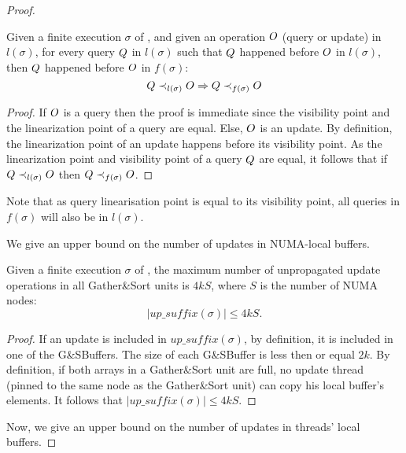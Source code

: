 \begin{proof}
\begin{lemma}\label{Lem: op_order}
Given a finite execution $\sigma$ of \mysketch, and given an operation $\mathnormal{O}$ (query or update) in $l(\sigma)$, for every query $\mathnormal{Q}$ in $l(\sigma)$ such that $\mathnormal{Q}$ happened before $\mathnormal{O}$ in \(l(\sigma)\), then $\mathnormal{Q}$ happened before $\mathnormal{O}$ in \(f(\sigma)\):  \[\mathnormal{Q} \prec_{l(\sigma)}\mathnormal{O} \Rightarrow  \mathnormal{Q} \prec_{f(\sigma)} \mathnormal{O}\]
\end{lemma}
\begin{proof}
If $\mathnormal{O}$ is a query then the proof is immediate since the visibility point and the linearization point of a query are equal. Else, $\mathnormal{O}$ is an update. By definition, the linearization point of an update happens before its visibility point. As the linearization point and visibility point of a query $\mathnormal{Q}$ are equal, it follows that if \(\mathnormal{Q} \prec_{l(\sigma)} \mathnormal{O}\) then \(\mathnormal{Q} \prec_{f(\sigma)} \mathnormal{O}\).
\end{proof}

Note that as query linearisation point is equal to its visibility point, all queries in $f(\sigma)$ will also be in $l(\sigma)$. 

We give an upper bound on the number of updates in NUMA-local buffers.

\begin{lemma}\label{Lem: GSBuffer_updates_num}
Given a finite execution $\sigma$ of \mysketch, the maximum number of unpropagated update operations in all Gather\&Sort units is \(4kS\), where $S$ is the number of NUMA nodes: \[|\mathit{up\_suffix}(\sigma)| \leq 4kS.\]
\end{lemma}
\begin{proof}
If an update is included in \(\mathit{up\_suffix}(\sigma)\), by definition, it is included in one of the G\&SBuffers. The size of each G\&SBuffer is less then or equal $2k$. By definition, if both arrays in a Gather\&Sort unit are full, no update thread (pinned to the same node as the Gather\&Sort unit) can copy his local buffer's elements. It follows that \(|\mathit{up\_suffix}(\sigma)| \leq 4kS\).
\end{proof}

Now, we give an upper bound on the number of updates in threads' local buffers.


\end{proof}
